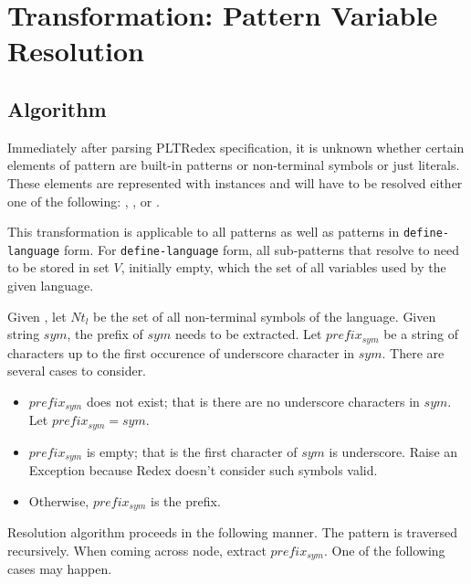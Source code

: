 \section{Transformation: Pattern Variable Resolution}
\label{section:pv-resolve}

\subsection{Algorithm}

Immediately after parsing PLTRedex specification, it is unknown whether certain elements of pattern are built-in patterns or non-terminal symbols or just literals. These elements are represented with \UnresolvedSymbol instances and will have to be resolved either one of the following: \BuiltInPatternNoArg, \NonTerminalNoArg, or \LiteralPatternNoArg.

This transformation is applicable to all patterns as well as patterns in \texttt{define-language} form. For \texttt{define-language} form, all sub-patterns that resolve to \LiteralPatternNoArg need to be stored in set $V$, initially empty, which the set of all variables used by the given language.

Given , let $Nt_{l}$ be the set of all non-terminal symbols of the language. Given string $sym$, the prefix of $sym$ needs to be extracted. Let $prefix_{sym}$ be a string of characters up to the first occurence of underscore character in $sym$. There are several cases to consider.

\begin{itemize}
\item $prefix_{sym}$ does not exist; that is there are no underscore characters in $sym$. Let $prefix_{sym}=sym$.
\item $prefix_{sym}$ is empty; that is the first character of $sym$ is underscore. Raise an Exception because Redex doesn't consider such symbols valid.
\item Otherwise, $prefix_{sym}$ is the prefix.
\end{itemize}

Resolution algorithm proceeds in the following manner. The pattern is traversed recursively. When coming across \UnresolvedSymbol node, extract $prefix_{sym}$. One of the following cases may happen.

